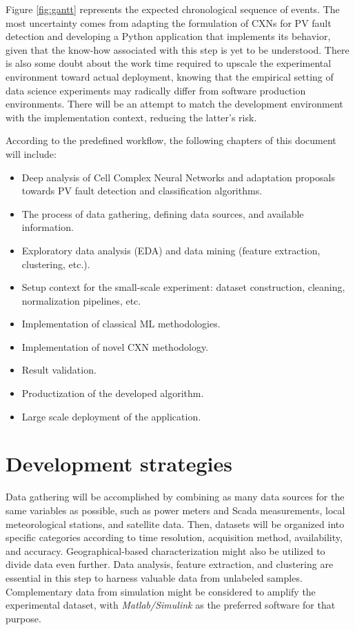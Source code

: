 Figure \ref{fig:gantt} represents the expected chronological sequence of events. The most uncertainty comes from adapting the formulation of CXNs for PV fault detection and developing a Python application that implements its behavior, given that the know-how associated with this step is yet to be understood. There is also some doubt about the work time required to upscale the experimental environment toward actual deployment, knowing that the empirical setting of data science experiments may radically differ from software production environments. There will be an attempt to match the development environment with the implementation context, reducing the latter's risk.

According to the predefined workflow, the following chapters of this document will include:

\begin{itemize}
    \item Deep analysis of Cell Complex Neural Networks and adaptation proposals towards PV fault detection and classification algorithms.
    \item The process of data gathering, defining data sources, and available information.
    \item Exploratory data analysis (EDA) and data mining (feature extraction, clustering, etc.).
    \item Setup context for the small-scale experiment: dataset construction, cleaning, normalization pipelines, etc.
    \item Implementation of classical ML methodologies.
    \item Implementation of novel CXN methodology.
    \item Result validation.
    \item Productization of the developed algorithm.
    \item Large scale deployment of the application.
\end{itemize}

\section{Development strategies}

Data gathering will be accomplished by combining as many data sources for the same variables as possible, such as power meters and Scada measurements, local meteorological stations, and satellite data. Then, datasets will be organized into specific categories according to time resolution, acquisition method, availability, and accuracy. Geographical-based characterization might also be utilized to divide data even further. Data analysis, feature extraction, and clustering are essential in this step to harness valuable data from unlabeled samples. Complementary data from simulation might be considered to amplify the experimental dataset, with \textit{Matlab/Simulink} as the preferred software for that purpose.


